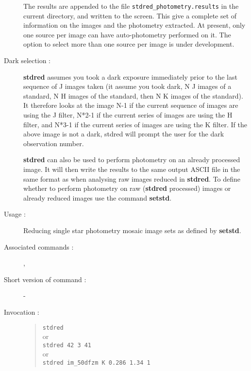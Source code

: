 \begin{description}
\begin{enumerate}
\end{enumerate}

The results are appended to the file {\tt stdred\_photometry.results}
in the current directory, and written to the screen.  This give a
complete set of information on the images and the photometry
extracted.  At present, only one source per image can have
auto-photometry performed on it.  The option to select more than one
source per image is under development.

\item[Dark selection :] {\bf stdred} assumes you took a dark exposure
immediately prior to the last sequence of J images taken (it assume you
took dark, N J images of a standard, N H images of the standard, then N
K images of the standard).  It therefore looks at the image N-1 if the
current sequence of images are using the J filter, N*2-1 if the current
series of images are using the H filter, and N*3-1 if the current
series of images are using the K filter.  If the above image is not a
dark, stdred will prompt the user for the dark observation number.

{\bf stdred}  can also be used to perform photometry on an already processed
image. It will then write the results to the same output ASCII file in
the same format as when analysing raw images reduced in {\bf stdred}.  To
define whether to perform photometry on raw ({\bf stdred} processed) images or
already reduced images use the command {\bf setstd}.

\item[Usage :] Reducing single star photometry mosaic image sets as
defined by {\bf setstd}.

\item[Associated commands :] {\tt {}},
{\tt {}}

\item[Short version of command :] -
\item[Invocation :]

\begin{quote}{\tt  stdred }\\
or \\
{\tt stdred 42 3 41 } \\
or \\
{\tt stdred im\_50dfzm K 0.286 1.34 1}
\end{quote}

\begin{itemize}


\end{itemize}
\end{description}
